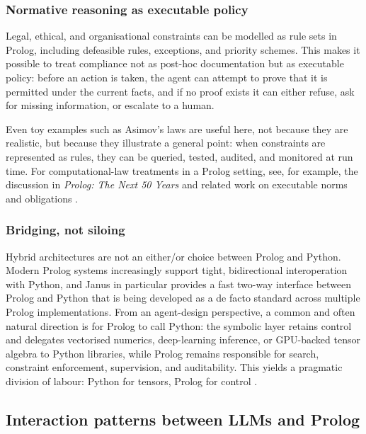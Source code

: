 \subsubsection{Normative reasoning as executable policy}

Legal, ethical, and organisational constraints can be modelled as rule sets in Prolog, including defeasible rules, exceptions, and priority schemes. This makes it possible to treat compliance not as post-hoc documentation but as executable policy: before an action is taken, the agent can attempt to prove that it is permitted under the current facts, and if no proof exists it can either refuse, ask for missing information, or escalate to a human.

Even toy examples such as Asimov's laws are useful here, not because they are realistic, but because they illustrate a general point: when constraints are represented as rules, they can be queried, tested, audited, and monitored at run time. For computational-law treatments in a Prolog setting, see, for example, the discussion in \textit{Prolog: The Next 50 Years} and related work on executable norms and obligations \cite{PNFY2025,Kowalski2025}.

\subsubsection{Bridging, not siloing}

Hybrid architectures are not an either/or choice between Prolog and Python. Modern Prolog systems increasingly support tight, bidirectional interoperation with Python, and Janus in particular provides a fast two-way interface between Prolog and Python that is being developed as a de facto standard across multiple Prolog implementations. From an agent-design perspective, a common and often natural direction is for Prolog to call Python: the symbolic layer retains control and delegates vectorised numerics, deep-learning inference, or GPU-backed tensor algebra to Python libraries, while Prolog remains responsible for search, constraint enforcement, supervision, and auditability. This yields a pragmatic division of labour: Python for tensors, Prolog for control \cite{WielemakerJanus,SwiftAndersen2023}.

\subsection{Interaction patterns between LLMs and Prolog}
\label{sec:interaction-patterns-llm-prolog}

